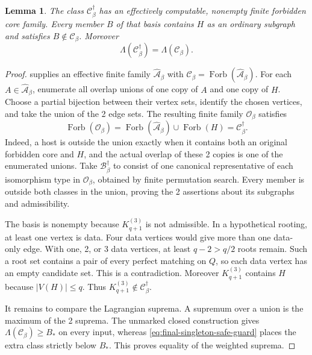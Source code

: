 \documentclass[10pt]{article}
\numberwithin{equation}{section}
\newtheorem{lemma}[lemma]{Lemma}\aliascntresetthe{lemma}
\theoremstyle{definition}
\newcommand{\Forb}{\operatorname{Forb}}\newcommand{\Ext}{\operatorname{Ext}}
\begin{document}
\begin{lemma}
\label{lem:final-singleton-effective-basis}
The class $\mathcal C^\dagger_\beta$ has an effectively computable, nonempty finite forbidden core family. Every member $B$ of that basis contains $H$ as an ordinary subgraph and satisfies $B\notin\mathcal C_\beta$. Moreover
\[
 \Lambda(\mathcal C^\dagger_\beta)
 =\Lambda(\mathcal C_\beta).
\]
\end{lemma}
\begin{proof}
 supplies an
effective finite family $\widehat{\mathcal A}_\beta$ with $\mathcal C_\beta=\Forb(\widehat{\mathcal A}_\beta)$. For each $A\in\widehat{\mathcal A}_\beta$, enumerate all overlap unions of one copy of $A$ and one copy of $H$. Choose a partial bijection between their vertex sets, identify the chosen vertices, and take the union of the 2 edge sets. The resulting finite family $\mathcal O_\beta$ satisfies
\[
 \Forb(\mathcal O_\beta)
 =\Forb(\widehat{\mathcal A}_\beta)\cup\Forb(H)
 =\mathcal C^\dagger_\beta.
\]
Indeed, a host is outside the union exactly when it contains both an original forbidden core and $H$, and the actual overlap of these 2 copies is one of the enumerated unions. Take $\mathcal B^\dagger_\beta$ to consist of one canonical representative of each isomorphism type in $\mathcal O_\beta$, obtained by finite permutation search. Every member is outside both classes in the union, proving the 2 assertions about its subgraphs and admissibility.

The basis is nonempty because $K_{q+1}^{(3)}$ is not admissible. In a hypothetical rooting, at least one vertex is data. Four data vertices would give more than one data-only edge. With one, 2, or 3 data vertices, at least $q-2>q/2$ roots remain. Such a root set contains a pair of every perfect matching on $Q$, so each data vertex has an empty candidate set. This is a contradiction. Moreover $K_{q+1}^{(3)}$ contains $H$ because $|V(H)|\le q$. Thus $K_{q+1}^{(3)}\notin\mathcal C^\dagger_\beta$.

It remains to compare the Lagrangian suprema. A supremum over a union is the maximum of the 2 suprema. The unmarked closed construction gives $\Lambda(\mathcal C_\beta)\ge B_*$ on every input, whereas \eqref{eq:final-singleton-safe-guard} places the extra class strictly below $B_*$. This proves equality of the weighted suprema.
\end{proof}
\end{document}
